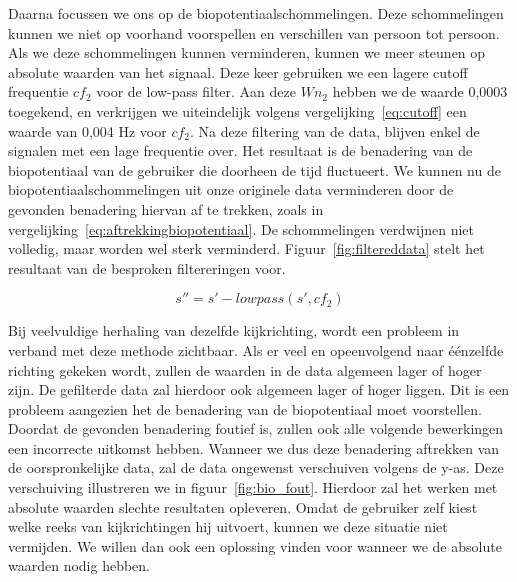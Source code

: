 \documentclass{article}
\begin{document}
Daarna focussen we ons op de biopotentiaalschommelingen. Deze schommelingen kunnen we niet op voorhand voorspellen en verschillen van persoon tot persoon. Als we deze schommelingen kunnen verminderen, kunnen we meer steunen op absolute waarden van het signaal. Deze keer gebruiken we een lagere cutoff frequentie $cf_2$ voor de low-pass filter. Aan deze $Wn_2$ hebben we de waarde 0,0003 toegekend, en verkrijgen we uiteindelijk volgens vergelijking~\ref{eq:cutoff} een waarde van 0,004 Hz voor $cf_2$. Na deze filtering van de data, blijven enkel de signalen met een lage frequentie over. Het resultaat is de benadering van de biopotentiaal van de gebruiker die doorheen de tijd fluctueert. We kunnen nu de biopotentiaalschommelingen uit onze originele data verminderen door de gevonden benadering hiervan af te trekken, zoals in vergelijking~\ref{eq:aftrekkingbiopotentiaal}. De schommelingen verdwijnen niet volledig, maar worden wel sterk verminderd. Figuur~\ref{fig:filtereddata} stelt het resultaat van de besproken filtereringen voor.

\begin{equation}
\label{eq:aftrekkingbiopotentiaal}
s'' = s' - lowpass(s', cf_2)
\end{equation}

Bij veelvuldige herhaling van dezelfde kijkrichting, wordt een probleem in verband met deze methode zichtbaar. Als er veel en opeenvolgend naar éénzelfde richting gekeken wordt, zullen de waarden in de data algemeen lager of hoger zijn. De gefilterde data zal hierdoor ook algemeen lager of hoger liggen. Dit is een probleem aangezien het de benadering van de biopotentiaal moet voorstellen. Doordat de gevonden benadering foutief is, zullen ook alle volgende bewerkingen een incorrecte uitkomst hebben. Wanneer we dus deze benadering aftrekken van de oorspronkelijke data, zal de data ongewenst verschuiven volgens de y-as. Deze verschuiving illustreren we in figuur~\ref{fig:bio_fout}.   Hierdoor zal het werken met absolute waarden slechte resultaten opleveren. Omdat de gebruiker zelf kiest welke reeks van kijkrichtingen hij uitvoert, kunnen we deze situatie niet vermijden. We willen dan ook een oplossing vinden voor wanneer we de absolute waarden nodig hebben.
\end{document}
